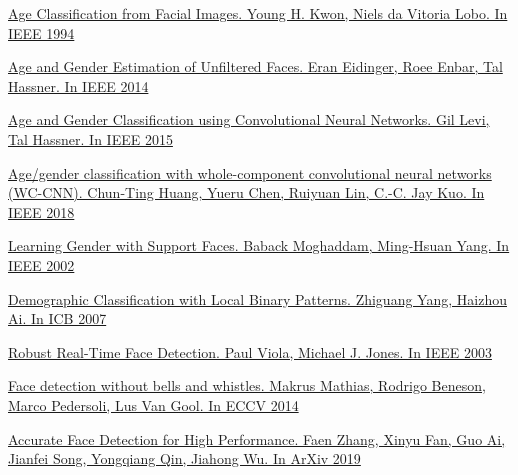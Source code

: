 \begin{thebibliography}{0}
    \hypertarget{age1994}{}
    \href{https://pdfs.semanticscholar.org/20cb/d360c8e6f70aac3e11853d81e3b18e4866c2.pdf}
    {Age Classification from Facial Images.
    Young H. Kwon, Niels da Vitoria Lobo.
    In IEEE 1994}

    \hypertarget{unfiltered}{}
    \href{https://www.openu.ac.il/home/hassner/Adience/EidingerEnbarHassner_tifs.pdf}
    {Age and Gender Estimation of Unfiltered Faces.
    Eran Eidinger, Roee Enbar, Tal Hassner.
    In IEEE 2014}

    \hypertarget{hassner}{}
    \href{https://talhassner.github.io/home/projects/cnn_agegender/CVPR2015_CNN_AgeGenderEstimation.pdf}
    {Age and Gender Classification using Convolutional Neural Networks.
    Gil Levi, Tal Hassner.
    In IEEE 2015}

    \hypertarget{INDIA}{}
    \href{https://ieeexplore.ieee.org/document/8282221}
    {Age/gender classification with whole-component convolutional neural networks (WC-CNN).
    Chun-Ting Huang, Yueru Chen, Ruiyuan Lin, C.-C. Jay Kuo.
    In IEEE 2018}

    \hypertarget{smoll}{}
    \href{https://merl.com/publications/docs/TR2002-12.pdf}
    {Learning Gender with Support Faces.
    Baback Moghaddam, Ming-Hsuan Yang.
    In IEEE 2002}

    \hypertarget{lbp_age}{}
    \href{https://link.springer.com/chapter/10.1007/978-3-540-74549-5_49}
    {Demographic Classification with Local Binary Patterns.
    Zhiguang Yang, Haizhou Ai. In ICB 2007}

    \hypertarget{face_detection}{}
    \href{http://www.face-rec.org/algorithms/Boosting-Ensemble/16981346.pdf}
    {Robust Real-Time Face Detection.
    Paul Viola, Michael J. Jones.
    In IEEE 2003}

    \hypertarget{face_detection2}{}
    \href{http://rodrigob.github.io/documents/2014_eccv_face_detection_with_supplementary_material.pdf}
    {Face detection without bells and whistles.
    Makrus Mathias, Rodrigo Beneson, Marco Pedersoli, Lus Van Gool.
    In ECCV 2014}

    \hypertarget{face_detection3}{}
    \href{https://arxiv.org/abs/1905.01585}
    {Accurate Face Detection for High Performance.
    Faen Zhang, Xinyu Fan, Guo Ai, Jianfei Song, Yongqiang Qin, Jiahong Wu. In ArXiv 2019}


\end{thebibliography}
